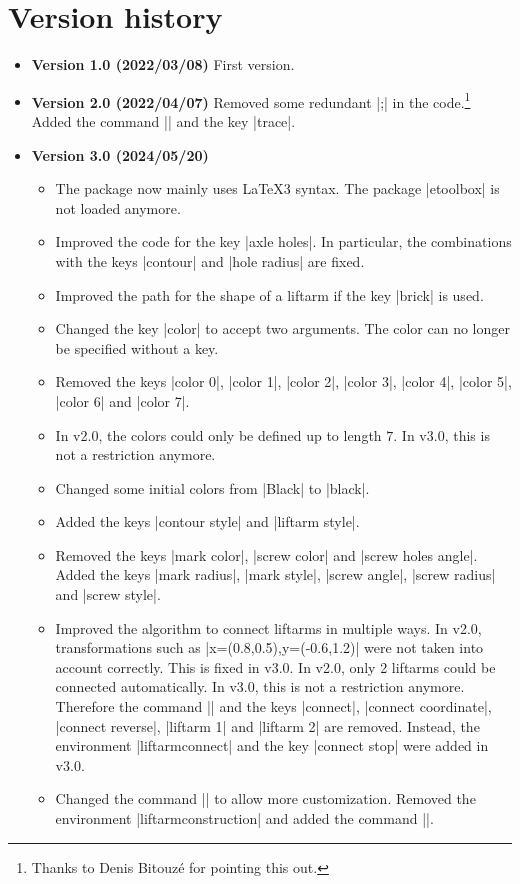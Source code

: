 \documentclass[a4paper,english,dvipsnames]{ltxdoc}
\begin{document}
\section{Version history}
\begin{itemize}
\item[] \textbf{Version 1.0 (2022/03/08)} First version.
\item[] \textbf{Version 2.0 (2022/04/07)} Removed some redundant |;| in the code.\footnote{Thanks to Denis Bitouzé for pointing this out.} Added the command |\liftarmanimate| and the key |trace|.
\item[] \textbf{Version 3.0 (2024/05/20)}
\begin{itemize}
\item The package now mainly uses \LaTeX3 syntax. The package |etoolbox| is not loaded anymore.
\item Improved the code for the key |axle holes|. In particular, the combinations with the keys |contour| and |hole radius| are fixed.
\item Improved the path for the shape of a liftarm if the key |brick| is used.
\item Changed the key |color| to accept two arguments. The color can no longer be specified without a key.
\item Removed the keys |color 0|, |color 1|, |color 2|, |color 3|, |color 4|, |color 5|, |color 6| and |color 7|.
\item In v2.0, the colors could only be defined up to length $7$. In v3.0, this is not a restriction anymore.
\item Changed some initial colors from |Black| to |black|.
\item Added the keys |contour style| and |liftarm style|.
\item Removed the keys |mark color|, |screw color| and |screw holes angle|. Added the keys |mark radius|, |mark style|, |screw angle|, |screw radius| and |screw style|.
\item Improved the algorithm to connect liftarms in multiple ways. In v2.0, transformations such as |x={(0.8,0.5)},y={(-0.6,1.2)}| were not taken into account correctly. This is fixed in v3.0. In v2.0, only 2 liftarms could be connected automatically. In v3.0, this is not a restriction anymore. Therefore the command |\liftarmconnect| and the keys |connect|, |connect coordinate|, |connect reverse|, |liftarm 1| and |liftarm 2| are removed. Instead, the environment |liftarmconnect| and the key |connect stop| were added in v3.0.
\item Changed the command |\liftarmconstruct| to allow more customization. Removed the environment |liftarmconstruction| and added the command |\liftarmconstructclear|.
\end{itemize}
\end{itemize}
\end{document}

